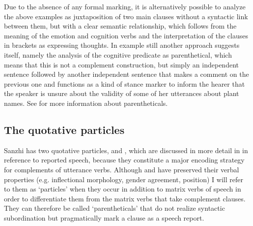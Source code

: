 Due to the absence of any formal marking, it is alternatively possible to analyze the above examples as juxtaposition of two main clauses without a syntactic link between them, but with a clear semantic relationship, which follows from the meaning of the emotion and cognition verbs and the interpretation of the clauses in brackets as expressing thoughts. In example  still another approach suggests itself, namely the analysis of the cognitive predicate as parenthetical, which means that this is not a complement construction, but simply an independent sentence followed by another independent sentence that makes a comment on the previous one and functions as a kind of stance marker to inform the hearer that the speaker is unsure about the validity of some of her utterances about plant names. See  for more information about parentheticals.




\subsection{The quotative particles}
\label{ssec:The quotative particles}

Sanzhi has two quotative particles,  and , which are discussed in more detail in  in reference to reported speech, because they constitute a major encoding strategy for complements of utterance verbs. Although  and  have preserved their verbal properties (e.g. inflectional morphology, gender agreement, position) I will refer to them as `particles' when they occur in addition to matrix verbs of speech in order to differentiate them from the matrix verbs that take complement clauses. They can therefore be called `parentheticals' that do not realize syntactic subordination but pragmatically mark a clause as a speech report.

